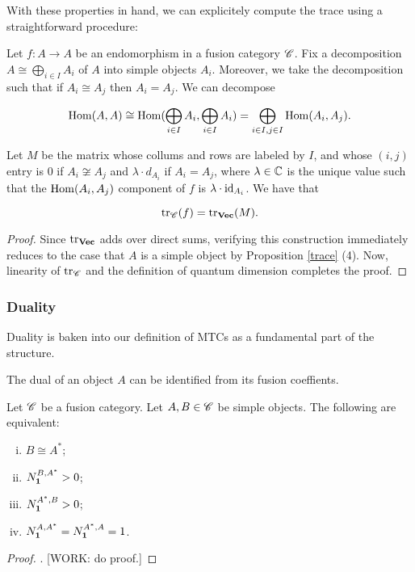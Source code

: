 With these properties in hand, we can explicitely compute the trace using a straightforward procedure:

\begin{corollary}\label{explicit-trace} Let $f:A\to A$ be an endomorphism in a fusion category $\mathscr{C}$. Fix a decomposition $A\cong \bigoplus_{i\in I}A_i$ of $A$ into simple objects $A_i$. Moreover, we take the decomposition such that if $A_i\cong A_j$ then $A_i=A_j$. We can decompose

$$\operatorname{Hom}(A,A)\cong \operatorname{Hom}(\bigoplus_{i\in I} A_i,\bigoplus_{i\in I}A_i)=\bigoplus_{i\in I, j\in I}\operatorname{Hom}(A_i,A_j).$$

Let $M$ be the matrix whose collums and rows are labeled by $I$, and whose $(i,j)$ entry is $0$ if $A_i\not\cong A_j$ and $\lambda \cdot d_{A_i}$ if $A_i=A_j$, where $\lambda\in \mathbb{C}$ is the unique value such that the $\operatorname{Hom}(A_i,A_j)$ component of $f$ is $\lambda\cdot \operatorname{id}_{A_i}$. We have that

$$\operatorname{tr}_{\mathscr{C}}(f)=\operatorname{tr}_{\mathbf{Vec}}(M).$$

\end{corollary}
\begin{proof} Since $\operatorname{tr}_{\mathbf{Vec}}$ adds over direct sums, verifying this construction immediately reduces to the case that $A$ is a simple object by Proposition \ref{trace} (4). Now, linearity of $\operatorname{tr}_{\mathscr{C}}$ and the definition of quantum dimension completes the proof.
\end{proof}

\subsubsection{Duality}

Duality is baken into our definition of MTCs as a fundamental part of the structure.


The dual of an object $A$ can be identified from its fusion coeffients.

\begin{proposition} Let $\mathscr{C}$ be a fusion category. Let $A,B\in \mathscr{C}$ be simple objects. The following are equivalent:

\begin{enumerate}[(i)]
\item $B\cong A^*$;
\item $N^{B,A^*}_{\mathbf{1}}>0$;
\item $N^{A^*,B}_{\mathbf{1}}>0$;
\item $N^{A,A^*}_{\mathbf{1}}=N^{A^*,A}_{\mathbf{1}}=1$.
\end{enumerate}
\end{proposition}
\begin{proof}. [WORK: do proof.]
\end{proof}

